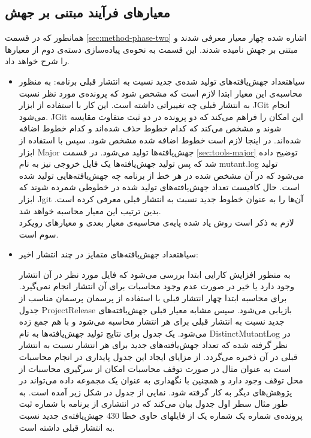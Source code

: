 \subsection{ معیارهای فرآیند مبتنی بر جهش}
همانطور که در قسمت \ref{sec:method-phase-two} اشاره شده چهار معیار معرفی شدند و مبتنی بر جهش نامیده شدند. این قسمت به نحوه‌ی پیاده‌سازی دسته‌ی دوم از معیارها را شرح خواهد داد. 
\begin{itemize}
\item
{}‌سیاه{تعداد جهش‌یافته‌های تولید شده‌ی جدید نسبت به انتشار قبلی برنامه:}
به منظور محاسبه‌ی این معیار ابتدا لازم است که مشخص شود که پرونده‌ی مورد نظر نسبت به انتشار قبلی چه تغییراتی داشته است. این کار با استفاده از ابزار JGit انجام  می‌شود. JGit این امکان را فراهم می‌کند که دو پرونده در دو ثبت متفاوت مقایسه شوند و مشخص می‌کند که کدام خطوط حذف شده‌اند و کدام خطوط اضافه شده‌اند. در اینجا لازم است خطوط اضافه شده  مشخص شود. سپس با استفاده از ابزار Major جهش‌یافته‌ها تولید می‌شود. در  قسمت  \ref{sec:tools-major} توضیح داده شد که پس تولید جهش‌یافته‌ها یک فایل خروجی نیز به نام mutant.log تولید می‌شود که در آن مشخص شده در هر خط از برنامه چه جهش‌یافته‌هایی تولید شده است. حال کافیست تعداد جهش‌یافته‌های تولید شده در خطوطی شمرده شوند که ابزار Jgit آن‌ها را به عنوان خطوط جدید نسبت به انتشار قبلی معرفی کرده است. بدین ترتیب این معیار محاسبه خواهد شد.\\
لازم به ذکر است روش یاد شده پایه‌ی محاسبه‌ی معیار بعدی و معیارهای رویکرد سوم است.
\item
{}‌سیاه{تعداد جهش‌یافته‌های متمایز در چند انتشار اخیر:}

 به منظور افزایش کارایی ابتدا بررسی می‌شود که فایل مورد نظر در آن انتشار وجود دارد یا خیر در صورت عدم وجود محاسبات برای آن انتشار انجام نمی‌گیرد.
برای محاسبه ابتدا چهار انتشار قبلی  با استفاده از پرسمان  پرسمان مناسب از جدول ProjectRelease بازیابی می‌شود. سپس مشابه معیار قبلی جهش‌یافته‌های جدید نسبت به انتشار قبلی برای هر انتشار محاسبه می‌شود و با هم جمع زده می‌شود.  یک جدول برای نتایج تولید جهش‌یافته‌ها  به نام  DistinctMutantLog در نظر گرفته شده که تعداد جهش‌یافته‌های جدید برای هر انتشار نسبت به انتشار قبلی در آن ذخیره می‌گردد. از مزایای ایجاد این جدول پایداری در انجام محاسبات است به عنوان مثال  در صورت توقف محاسبات امکان از سرگیری محاسبات از محل توقف وجود  دارد و همچنین  با نگهداری به عنوان یک مجموعه داده می‌تواند در پژوهش‌های دیگر به کار گرفته شود. نمایی از جدول در شکل زیر آمده است. به طور مثال سطر اول جدول بیان می‌کند که در انتشاری از برنامه با شماره ثبت    پرونده‌ی شماره یک شماره یک از فایلهای حاوی خطا 430 جهش‌یافته‌ی جدید نسبت به انتشار قبلی داشته است.

\end{itemize}
